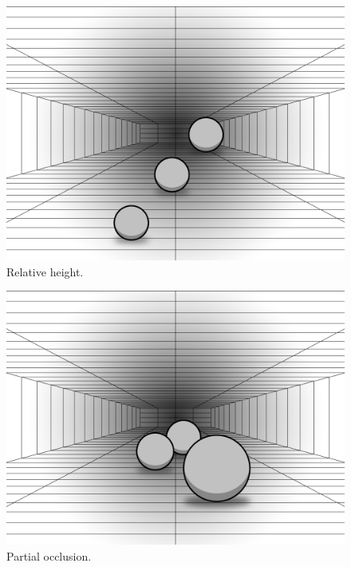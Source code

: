 \begin{figure}[H]
	\centering
	\includegraphics[width=1\linewidth]{figure/Analysis/relativeHeight.png}
	\caption{Relative height.}
	\label{fig:relativeHeight}
\end{figure}


\begin{figure}[H]
	\centering
	\includegraphics[width=1\linewidth]{figure/Analysis/partialOcclusion.png}
	\caption{Partial occlusion.}
	\label{fig:partialOcclusion}
\end{figure}


